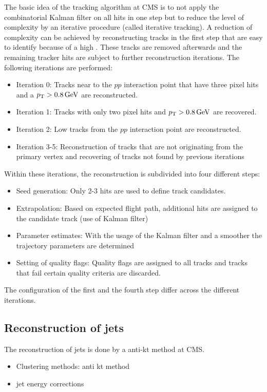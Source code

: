 The basic idea of the tracking algorithm at CMS is to not apply the combinatorial Kalman filter on all hits in one step but to reduce the level of complexity by an iterative procedure (called iterative tracking).
A reduction of complexity can be achieved by reconstructing tracks in the first step that are easy to identify because of \eg a high \pt. 
These tracks are removed afterwards and the remaining tracker hits are subject to further reconstruction iterations.
The following iterations are performed:
\begin{itemize}
\item Iteration 0: Tracks near to the $pp$ interaction point that have three pixel hits and a $p_{\text{T}}>0.8\,\text{Ge}\kern-0.06667em\text{V}$ are reconstructed.
\item Iteration 1: Tracks with only two pixel hits and $p_{\text{T}}>0.8\,\text{Ge}\kern-0.06667em\text{V}$ are recovered.
\item Iteration 2: Low \pt tracks from the $pp$ interaction point are reconstructed.
\item Iteration 3-5: Reconstruction of tracks that are not originating from the primary vertex and recovering of tracks not found by previous iterations
\end{itemize}
Within these iterations, the reconstruction is subdivided into four different steps:
\begin{itemize}
\item Seed generation: Only 2-3 hits are used to define track candidates.
\item Extrapolation: Based on expected flight path, additional hits are assigned to the candidate track (use of Kalman filter)
\item Parameter estimates: With the usage of the Kalman filter and a smoother the trajectory parameters are determined
\item Setting of quality flags: Quality flags are assigned to all tracks and tracks that fail certain quality criteria are discarded.
\end{itemize}
The configuration of the first and the fourth step differ across the different iterations.  

\subsection*{Reconstruction of jets} 
The reconstruction of jets is done by a anti-kt method at CMS.
\begin{itemize}
\item Clustering methods: anti kt method
\item jet energy corrections
\end{itemize}

